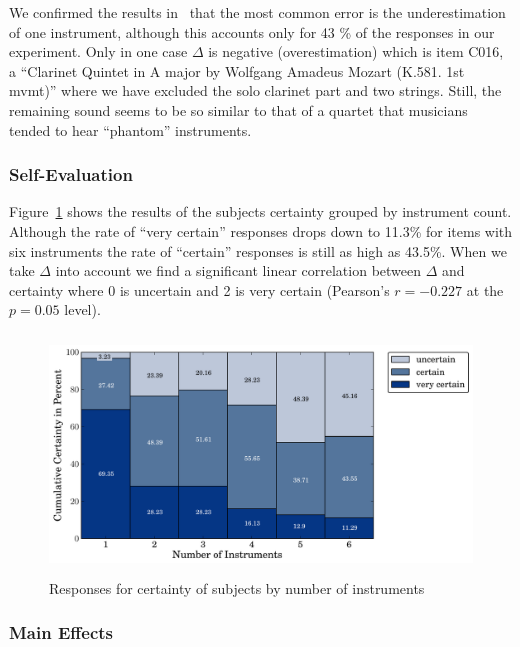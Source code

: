 We confirmed the results in~\cite{huron89} that the most common error is the underestimation of one instrument, although this accounts only for 43 \% of the responses in our experiment. Only in one case $\Delta$ is negative (overestimation) which is item C016, a ``Clarinet Quintet in A major by Wolfgang Amadeus Mozart (K.581. 1st mvmt)'' where we have excluded the solo clarinet part and two strings. Still, the remaining sound seems to be so similar to that of a quartet that musicians tended to hear ``phantom'' instruments.

\subsubsection*{Self-Evaluation}

Figure~\ref{fig:certainty} shows the results of the subjects certainty grouped by instrument count. Although the rate of ``very certain'' responses drops down to 11.3\% for items with six instruments the rate of ``certain'' responses is still as high as 43.5\%. When we take $\Delta$ into account we find a significant linear correlation between $\Delta$ and certainty where 0 is uncertain and 2 is very certain (Pearson's $r = -0.227$ at the $p=0.05$ level).

\begin{figure}[h]
	\centering
		\includegraphics[height=2.5in]{Chapters/07_Analysis_Experiment/images/certainty.pdf}
	\caption{Responses for certainty of subjects by number of instruments}
	\label{fig:certainty}
\end{figure}

\subsubsection*{Main Effects}

